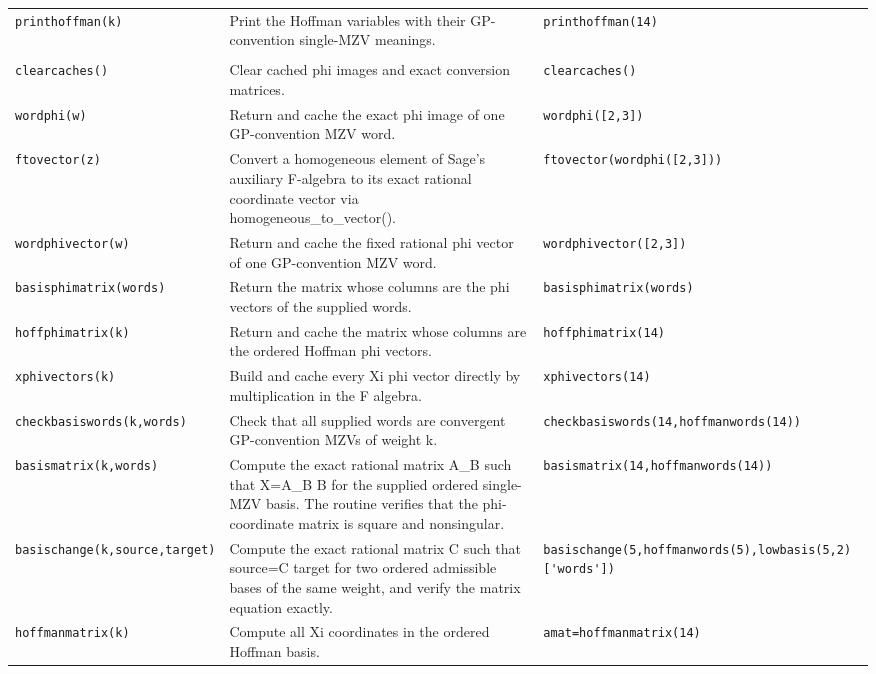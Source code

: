 \documentclass[12pt]{amsproc}
\newcommand{\code}[1]{\nolinkurl{#1}}
\begin{document}
\begin{longtable}{@{}L{0.245\textwidth}L{0.440\textwidth}L{0.245\textwidth}@{}}
\addlinespace[2pt]
\code{printhoffman(k)} & Print the Hoffman variables with their GP-convention single-MZV meanings. & \code{printhoffman(14)} \\
\addlinespace[2pt]
\addlinespace[3pt]\\[2pt]
\code{clearcaches()} & Clear cached phi images and exact conversion matrices. & \code{clearcaches()} \\
\addlinespace[2pt]
\code{wordphi(w)} & Return and cache the exact phi image of one GP-convention MZV word. & \code{wordphi([2,3])} \\
\addlinespace[2pt]
\code{ftovector(z)} & Convert a homogeneous element of Sage's auxiliary F-algebra to its exact rational coordinate vector via homogeneous\_to\_vector(). & \code{ftovector(wordphi([2,3]))} \\
\addlinespace[2pt]
\code{wordphivector(w)} & Return and cache the fixed rational phi vector of one GP-convention MZV word. & \code{wordphivector([2,3])} \\
\addlinespace[2pt]
\code{basisphimatrix(words)} & Return the matrix whose columns are the phi vectors of the supplied words. & \code{basisphimatrix(words)} \\
\addlinespace[2pt]
\code{hoffphimatrix(k)} & Return and cache the matrix whose columns are the ordered Hoffman phi vectors. & \code{hoffphimatrix(14)} \\
\addlinespace[2pt]
\code{xphivectors(k)} & Build and cache every Xi phi vector directly by multiplication in the F algebra. & \code{xphivectors(14)} \\
\addlinespace[2pt]
\code{checkbasiswords(k,words)} & Check that all supplied words are convergent GP-convention MZVs of weight k. & \code{checkbasiswords(14,hoffmanwords(14))} \\
\addlinespace[2pt]
\code{basismatrix(k,words)} & Compute the exact rational matrix A\_B such that X=A\_B B for the supplied ordered single-MZV basis. The routine verifies that the phi-coordinate matrix is square and nonsingular. & \code{basismatrix(14,hoffmanwords(14))} \\
\addlinespace[2pt]
\code{basischange(k,source,target)} & Compute the exact rational matrix C such that source=C target for two ordered admissible bases of the same weight, and verify the matrix equation exactly. & \code{basischange(5,hoffmanwords(5),lowbasis(5,2)['words'])} \\
\addlinespace[2pt]
\code{hoffmanmatrix(k)} & Compute all Xi coordinates in the ordered Hoffman basis. & \code{amat=hoffmanmatrix(14)} \\

\end{longtable}
\end{document}
